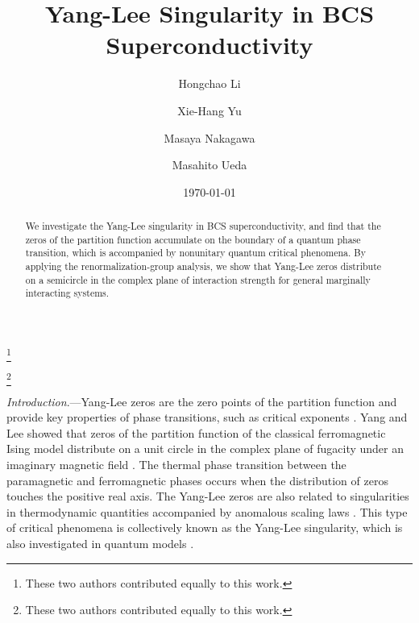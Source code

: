 \documentclass[aps,prl,twocolumn,nofootinbib,superscriptaddress,notitlepage,longbibliography]{revtex4-1}
\begin{document}
\title{Yang-Lee Singularity in BCS Superconductivity}
\author{Hongchao Li}
\thanks{These two authors contributed equally to this work.}

\author{Xie-Hang Yu}
\thanks{These two authors contributed equally to this work.}

\author{Masaya Nakagawa}

\author{Masahito Ueda}

\date{\today}
\begin{abstract}
	We investigate the Yang-Lee singularity in BCS superconductivity, and find that the zeros of the partition function accumulate on the boundary of a quantum phase transition, which is accompanied by nonunitary quantum critical phenomena. By applying the renormalization-group analysis, we show that Yang-Lee zeros distribute on a semicircle in the complex plane of interaction strength for general marginally interacting systems. %
	\end{abstract}
	\maketitle
	\emph{Introduction}.---Yang-Lee zeros \cite{PhysRev.87.404,PhysRev.87.410} are the zero points of the partition function and provide key properties of phase transitions, such as critical exponents	\cite{Fisher1965,Fisher:1978vn}. Yang and Lee showed \cite{PhysRev.87.404,PhysRev.87.410} that zeros of the partition function of the classical ferromagnetic Ising model distribute on a unit circle in the complex
	plane of fugacity under an imaginary magnetic field \cite{Simon:1973tr,Newman:1974wi,Lieb:1981vb,Kortman:1971tw}.
	The thermal phase transition between the paramagnetic and ferromagnetic
	phases occurs when the distribution of zeros touches the positive real axis. The Yang-Lee zeros are also related to singularities in thermodynamic quantities accompanied by anomalous scaling laws \cite{Fisher:1978vn,Kurtze:1979wb,10.1143/PTP.69.14,Cardy:1985ub,Cardy:1989uo,Zamolodchikov:1991tl}.
	This type of critical phenomena is collectively known as the Yang-Lee singularity, which is also investigated
	in quantum models \cite{Gehlen_1991,Sumaryada:2007uu,PhysRevB.53.7704,Matsumoto2020}.
	
\end{document}
